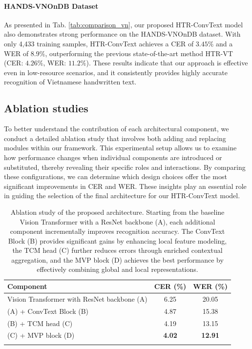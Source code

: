 \documentclass[final,5p,times]{elsarticle}
\begin{document}
\paragraph{HANDS-VNOnDB Dataset}
As presented in Tab. \ref{tab:comparison_vn}, our proposed HTR-ConvText model also demonstrates strong performance on the HANDS-VNOnDB dataset. With only 4,433 training samples, HTR-ConvText achieves a CER of $3.45\%$ and a WER of $8.9\%$, outperforming the previous state-of-the-art method HTR-VT (CER: $4.26\%$, WER: $11.2\%$). These results indicate that our approach is effective even in low-resource scenarios, and it consistently provides highly accurate recognition of Vietnamese handwritten text.
\subsection{Ablation studies}
To better understand the contribution of each architectural component, we conduct a detailed ablation study that involves both adding and replacing modules within our framework. This experimental setup allows us to examine how performance changes when individual components are introduced or substituted, thereby revealing their specific roles and interactions. By comparing these configurations, we can determine which design choices offer the most significant improvements in CER and WER. These insights play an essential role in guiding the selection of the final architecture for our HTR-ConvText model.
\begin{table}[!t]
\centering
\caption{
Ablation study of the proposed architecture. Starting from the baseline Vision Transformer with a ResNet backbone (A), each additional component incrementally improves recognition accuracy. The ConvText Block (B) provides significant gains by enhancing local feature modeling, the TCM head (C) further reduces errors through enriched contextual aggregation, and the MVP block (D) achieves the best performance by effectively combining global and local representations.
}
\begin{tabular}{lcc}
\hline
\textbf{Component} & \textbf{CER (\%)} & \textbf{WER (\%)} \\
\hline
Vision Transformer with ResNet backbone (A) & 6.25 & 20.05 \\
(A) + ConvText Block (B) & 4.87 & 15.38 \\
(B) +  TCM head (C) & 4.19 & 13.15 \\
(C) +  MVP block (D) & \textbf{4.02} & \textbf{12.91} \\
\hline
\label{table:component}
\end{tabular}
\end{table}
\end{document}
